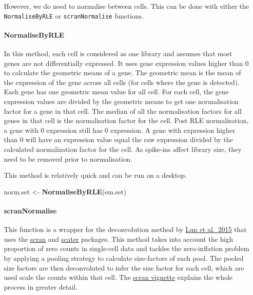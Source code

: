 \documentclass[]{article}
\newenvironment{Shaded}{\begin{snugshade}}{\end{snugshade}}
\newcommand{\KeywordTok}[1]{\textcolor[rgb]{0.13,0.29,0.53}{\textbf{#1}}}
\newcommand{\NormalTok}[1]{#1}
\newcommand{\StringTok}[1]{\textcolor[rgb]{0.31,0.60,0.02}{#1}}
\let\oldparagraph\paragraph
\renewcommand{\paragraph}[1]{\oldparagraph{#1}\mbox{}}
\begin{document}
However, we do need to normalise between cells. This can be done with
either the \texttt{NormaliseByRLE} or \texttt{scranNormalise} functions.

\hypertarget{normalisebyrle}{%
\paragraph{NormaliseByRLE}\label{normalisebyrle}}

In this method, each cell is considered as one library and assumes that
most genes are not differentially expressed. It uses gene expression
values higher than 0 to calculate the geometric means of a gene. The
geometric mean is the mean of the expression of the gene across all
cells (for cells where the gene is detected). Each gene has one
geometric mean value for all cell. For each cell, the gene expression
values are divided by the geometric means to get one normalisation
factor for a gene in that cell. The median of all the normalisation
factors for all genes in that cell is the normalisation factor for the
cell. Post RLE normalisation, a gene with 0 expression still has 0
expression. A gene with expression higher than 0 will have an expression
value equal the raw expression divided by the calculated normalization
factor for the cell. As spike-ins affect library size, they need to be
removed prior to normalisation.

This method is relatively quick and can be run on a desktop.

\begin{Shaded}
\begin{Highlighting}[]
\NormalTok{norm.set <-}\StringTok{ }\KeywordTok{NormaliseByRLE}\NormalTok{(em.set)}
\end{Highlighting}
\end{Shaded}

\hypertarget{scrannormalise}{%
\paragraph{scranNormalise}\label{scrannormalise}}

This function is a wrapper for the deconvolution method by
\href{https://bioconductor.org/packages/release/bioc/html/scater.html}{Lun
et al.~2015} that uses the
\href{https://f1000research.com/articles/5-2122/v2}{scran} and
\href{https://bioconductor.org/packages/release/bioc/html/scater.html}{scater}
packages. This method takes into account the high proportion of zero
counts in single-cell data and tackles the zero-inflation problem by
applying a pooling strategy to calculate size-factors of each pool. The
pooled size factors are then deconvoluted to infer the size factor for
each cell, which are used scale the counts within that cell. The
\href{https://bioconductor.org/packages/release/bioc/vignettes/scran/inst/doc/scran.html}{scran
vignette} explains the whole process in greater detail.
\end{document}
